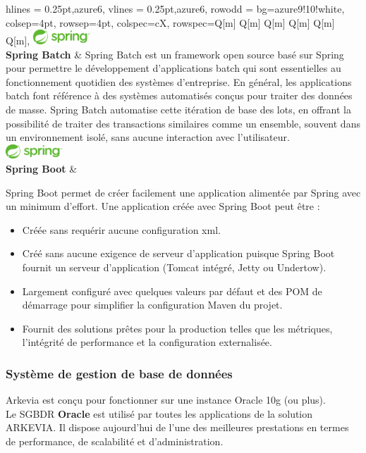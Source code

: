 \begin{longtblr}[caption={Technologies utilisées pour les solutions back-end}]{
    hlines = {0.25pt,azure6},
    vlines = {0.25pt,azure6},
    row{odd} = {bg=azure9!10!white},
    colsep=4pt,
    rowsep=4pt,
	colspec={cX},
    rowspec={Q[m] Q[m] Q[m] Q[m] Q[m] Q[m]},
}
{
\includegraphics[height=5.5mm]{images/sec5/spring.pdf}\\\textbf{Spring Batch}
}
& 
Spring Batch est un framework open source basé sur Spring pour permettre le développement d'applications batch qui sont essentielles au fonctionnement quotidien des systèmes d'entreprise. En général, les applications batch font référence à des systèmes automatisés conçus pour traiter des données de masse.
Spring Batch automatise cette itération de base des lots, en offrant la possibilité de traiter des transactions similaires comme un ensemble, souvent dans un environnement isolé, sans aucune interaction avec l'utilisateur.
\\

 {\includegraphics[height=5.5mm]{images/sec5/spring.pdf}
 \\\textbf{Spring Boot}
 }
&  
\begin{minipage}{\linewidth}
Spring Boot permet de créer facilement une application alimentée par Spring avec un minimum d'effort. Une application créée avec Spring Boot peut être :
\raggedright
\begin{itemize}[leftmargin=*]
\item Créée sans requérir aucune configuration xml.
\item Créé sans aucune exigence de serveur d'application puisque Spring Boot fournit un serveur d'application (Tomcat intégré, Jetty ou Undertow).
\item Largement configuré avec quelques valeurs par défaut et des POM de démarrage pour simplifier la configuration Maven du projet.
\item Fournit des solutions prêtes pour la production telles que les métriques, l'intégrité de performance et la configuration externalisée.
\end{itemize}
\end{minipage}
\end{longtblr}
\subsubsection{Système de gestion de base de données}
Arkevia est conçu pour fonctionner sur une instance Oracle 10g  (ou plus).\\
Le SGBDR \textbf{Oracle} est utilisé par toutes les applications de la solution ARKEVIA. Il dispose aujourd'hui de l'une des meilleures prestations en termes de performance, de scalabilité et d'administration.
